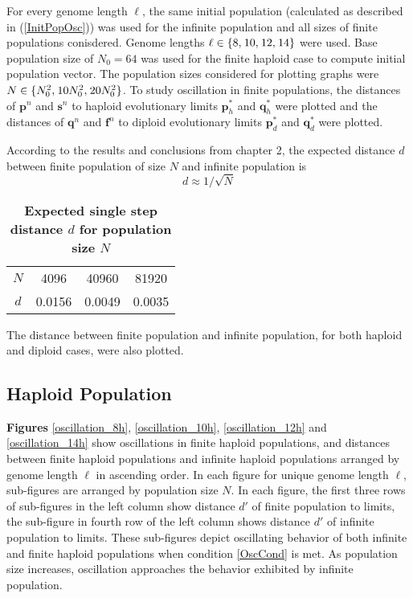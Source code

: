 For every genome length $\ell$, the same initial population (calculated as described in (\ref{InitPopOsc})) was used for the infinite population and all 
sizes of finite populations conisdered.
Genome lengths $\ell \in \{8, \hspace{0.01in}10, \hspace{0.01in}12, \hspace{0.01in}14\}$ were used. Base population size of $N_0 = 64$ was used 
for the finite haploid case to compute initial population vector. The population sizes considered for plotting 
graphs were $N \in \{N_0^2, \hspace{0.01in}10N_0^2, \hspace{0.01in}20N_0^2\}$. 
To study oscillation in finite populations, the distances of $\bm{p}^n$ and $\bm{s}^n$ to haploid evolutionary limits $\bm{p}_h^{\ast}$ and 
$\bm{q}_h^{\ast}$ were plotted and the distances of $\bm{q}^n$ and 
$\bm{f}^n$ to diploid evolutionary limits $\bm{p}_d^{\ast}$ and $\bm{q}_d^{\ast}$ were plotted. 

According to the results and conclusions from 
chapter 2, the expected distance $d$ between finite population of size $N$ and infinite population is 
\[
d \approx 1/\sqrt{N}
\]
\begin{table}[H]
\caption{\textbf{Expected single step distance $d$ for population size $N$}}
\centering
\begin{tabular}{c c c c}
\hline
$N$ & 4096 & 40960 & 81920 \\
$d$ & 0.0156 & 0.0049 & 0.0035 \\
\hline
\end{tabular}
\label{tableExpectedDistance}
\end{table}
The distance between finite population and infinite population, for both haploid and diploid cases, were also plotted. 

\subsection{Haploid Population}

\textbf{ Figures} \ref{oscillation_8h}, \ref{oscillation_10h}, \ref{oscillation_12h} and
\ref{oscillation_14h} show oscillations in finite haploid populations, and distances 
between finite haploid populations and infinite haploid populations arranged by genome length $\ell$ in ascending order. 
In each figure for unique genome length $\ell$, sub-figures 
are arranged by population size $N$. In each figure, the first three rows of sub-figures in the left column show distance $d'$ of finite population 
to limits, the sub-figure in fourth row of the left column shows distance $d'$ of infinite population to limits. These sub-figures depict 
oscillating behavior of both infinite and finite haploid populations when condition \ref{OscCond} is met. 
As population size increases, oscillation approaches the behavior exhibited by infinite population. 

